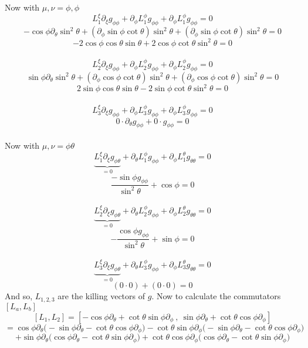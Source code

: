 \documentclass[12pt]{article}
\begin{document}
\begin{enumerate}
  Now with $\mu ,\nu = \phi ,\phi$
  $$ L_1^{\xi} \partial_{\xi} g_{\phi \phi} + \partial_{\phi} L_1^{\phi} g_{\phi \phi} + \partial_{\phi} L_1^{\phi} g_{\phi \phi} = 0 $$
  $$ - \cos \phi \partial_{\theta} \sin^2 \theta + ( \partial_{\phi} \sin \phi \cot \theta ) \sin^2 \theta + ( \partial_{\phi} \sin \phi \cot \theta ) \sin^2 \theta = 0 $$
  $$ - 2 \cos \phi \cos \theta \sin \theta + 2 \cos \phi \cot \theta \sin^2 \theta = 0 $$
  \\
  $$ L_2^{\xi} \partial_{\xi} g_{\phi \phi} + \partial_{\phi} L_2^{\phi} g_{\phi \phi} + \partial_{\phi} L_2^{\phi} g_{\phi \phi} = 0 $$
  $$ \sin \phi \partial_{\theta} \sin^2 \theta + ( \partial_{\phi} \cos \phi \cot \theta ) \sin^2 \theta + ( \partial_{\phi} \cos \phi \cot \theta) \sin^2 \theta = 0 $$ 
  $$ 2 \sin \phi \cos \theta \sin \theta - 2 \sin \phi \cot \theta \sin^2 \theta = 0 $$
  \\
  $$ L_3^{\xi} \partial_{\xi} g_{\phi \phi} + \partial_{\phi} L_3^{\phi} g_{\phi \phi} + \partial_{\phi} L_3^{\phi} g_{\phi \phi} = 0 $$
  $$ 0 \cdot \partial_{\theta} g_{\phi \phi} + 0 \cdot g_{\phi \phi} = 0 $$
  \\
  Now with $\mu, \nu = \phi \theta$ 
  $$ \underbrace{L_1^{\xi} \partial_{\xi} g_{\phi \theta} }_{=0} + \partial_{\theta} L_1^{\phi} g_{\phi \phi} + \partial_{\phi} L_1^{\theta} g_{\theta \theta} = 0 $$
  $$ \frac{- \sin \phi g_{\phi \phi} }{\sin^2 \theta} + \cos \phi = 0 $$
  \\
  $$ \underbrace{L_2^{\xi} \partial_{\xi} g_{\phi \theta} }_{=0} + \partial_{\theta} L_2^{\phi} g_{\phi \phi} + \partial_{\phi} L_2^{\theta} g_{\theta \theta} = 0 $$
  $$ - \frac{ \cos \phi g_{\phi \phi}}{\sin^2 \theta} + \sin \phi = 0 $$
  \\
  $$ \underbrace{L_3^{\xi} \partial_{\xi} g_{\phi \theta} }_{=0} + \partial_{\theta} L_3^{\phi} g_{\phi \phi} + \partial_{\phi} L_3^{\theta} g_{\theta \theta} = 0 $$
  $$ (0 \cdot 0) + (0 \cdot 0) = 0 $$
  And so, $L_{1,2,3}$ are the killing vectors of $g$. Now to calculate the commutators $[L_a, L_b]$ 
  $$ [L_1, L_2] = [- \cos \phi \partial_{\theta} + \cot \theta \sin \phi \partial_{\phi}\ , \ \sin \phi \partial_{\theta} + \cot \theta \cos \phi \partial_{\phi} ] $$
  $$ = \cos \phi \partial_{\theta} \Big( - \sin \phi \partial_{\theta} - \cot \theta \cos \phi \partial_{\phi} \Big) - \cot \theta \sin \phi \partial_{\phi} \Big( - \sin \phi \partial_{\theta} - \cot \theta \cos \phi \partial_{\phi} \Big) $$
  $$ + \sin \phi \partial_{\theta} \Big( \cos \phi \partial_{\theta} - \cot \theta \sin \phi \partial_{\phi} \Big) + \cot \theta \cos \phi \partial_{\phi} \Big( \cos \phi \partial_{\theta} - \cot \theta \sin \phi \partial_{\phi} \Big) $$

\end{enumerate}
\end{document}
